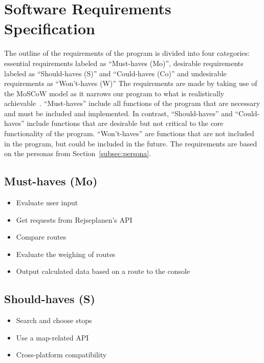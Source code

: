 \section{Software Requirements Specification}\label{sec:software-requirements-specification}

The outline of the requirements of the program is divided into four categories: essential requirements labeled as
``Must-haves (Mo)'', desirable requirements labeled as ``Should-haves (S)'' and ``Could-haves (Co)'' and
undesirable requirements as ``Won't-haves (W)''
The requirements are made by taking use of the MoSCoW model as it narrows our program to what is realistically
achievable~\cite{hudaib2018requirements}.
``Must-haves'' include all functions of the program that are necessary and must be included and implemented.
In contrast, ``Should-haves'' and ``Could-haves'' include functions that are desirable but not critical to
the core functionality of the program.
``Won't-haves'' are functions that are not included in the program, but could be included in the future.
The requirements are based on the personas from Section~\ref{subsec:persona}.

\subsection{Must-haves (Mo)}\label{subsec:must-haves}

\begin{itemize}
    \item Evaluate user input
    \item Get requests from Rejseplanen’s API
    \item Compare routes
    \item Evaluate the weighing of routes
    \item Output calculated data based on a route to the console
\end{itemize}

\subsection{Should-haves (S)}\label{subsec:should-haves}

\begin{itemize}
    \item Search and choose stops
    \item Use a map-related API
    \item Cross-platform compatibility
\end{itemize}

